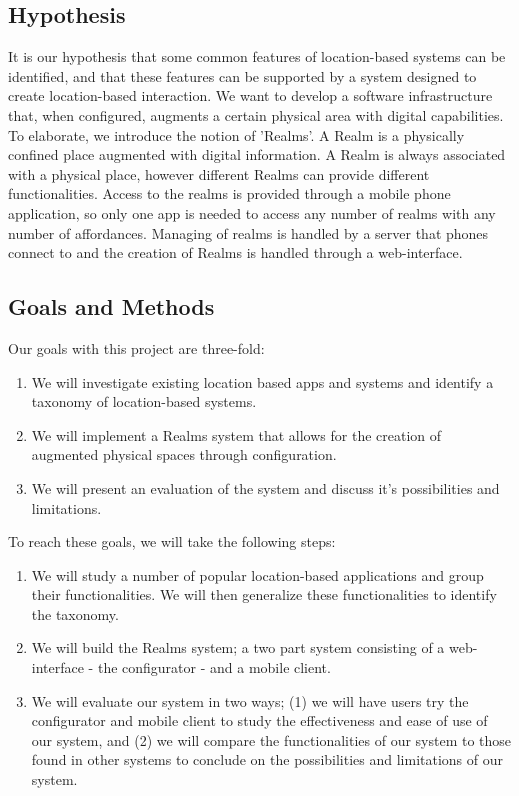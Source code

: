 
\subsection{Hypothesis} %
\label{sub:hypothesis}
It is our hypothesis that some common features of location-based systems can be identified, and that these features can be supported by a system designed to create location-based interaction. We want to develop a software infrastructure that, when configured, augments a certain physical area with digital capabilities. To elaborate, we introduce the notion of 'Realms'. A Realm is a physically confined place augmented with digital information. A Realm is always associated with a physical place, however different Realms can provide different functionalities. Access to the realms is provided through a mobile phone application, so only one app is needed to access any number of realms with any number of affordances. Managing of realms is handled by a server that phones connect to and the creation of Realms is handled through a web-interface. 

\subsection{Goals and Methods} %
\label{sub:goals_and_methods}
Our goals with this project are three-fold:
\begin{enumerate}
	\item We will investigate existing location based apps and systems and identify a taxonomy of location-based systems.
	\item We will implement a Realms system that allows for the creation of augmented physical spaces through configuration. 
	\item We will present an evaluation of the system and discuss it's possibilities and limitations.
\end{enumerate}

\noindent To reach these goals, we will take the following steps:

\begin{enumerate}
	\item We will study a number of popular location-based applications and group their functionalities. We will then generalize these functionalities to identify the taxonomy.
	\item We will build the Realms system; a two part system consisting of a web-interface - the configurator - and a mobile client.
	\item We will evaluate our system in two ways; (1) we will have users try the configurator and mobile client to study the effectiveness and ease of use of our system, and (2) we will compare the functionalities of our system to those found in other systems to conclude on the possibilities and limitations of our system.
\end{enumerate}

